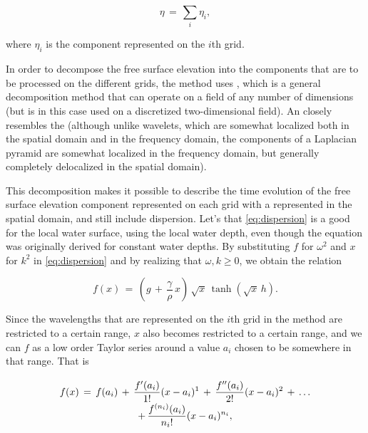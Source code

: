 \begin{equation} \label{eq:laplacian_pyramid_composition}
\eta \,=\, \sum_i \eta_i,
\end{equation}

where $\eta_i$ is the component represented on the $i$th grid.

In order to decompose the free surface elevation into the components that are to be processed on the different grids, the method uses \LPD, which is a general decomposition method that can operate on a field of any number of dimensions (but is in this case used on a discretized two-dimensional field). An \LPD closely resembles the  (although unlike wavelets, which are somewhat localized both in the spatial domain and in the frequency domain, the components of a Laplacian pyramid are somewhat localized in the frequency domain, but generally completely delocalized in the spatial domain).

This decomposition makes it possible to describe the time evolution of the free surface elevation component represented on each grid with a \PDE represented in the spatial domain, and still include dispersion. Let's \assume that \eqref{eq:dispersion} is a good \approximation for the local water surface, using the local water depth, even though the equation was originally derived for constant water depths. By substituting $f$ for $\omega^2$ and $x$ for $k^2$ in \eqref{eq:dispersion} and by realizing that $\omega, k \geq 0$, we obtain the relation

\begin{equation} \label{eq:dispersion_modified}
f(x) \,=\, \left(g\,+\,\frac{\gamma}{\rho}\,x\right)\,\sqrt{x}\,\tanh(\sqrt{x}\,h).
\end{equation}

Since the wavelengths that are represented on the $i$th grid in the method are restricted to a certain range, $x$ also becomes restricted to a certain range, and we can \approximate $f$ as a low order Taylor series around a value $a_i$ chosen to be somewhere in that range. That is

\begin{equation} \label{eq:dispersion_modified_taylor}
\renewcommand*{\arraystretch}{2}
\begin{array}{c}
\displaystyle f(x) \,=\, f(a_i) \,+\, \frac{f'(a_i)}{1!}(x-a_i)^1 \,+\, \frac{f''(a_i)}{2!}(x-a_i)^2 \,+\, \dots \\
\displaystyle +\, \frac{f^{(n_i)}(a_i)}{n_i!}(x-a_i)^{n_i},
\end{array}
\end{equation}

